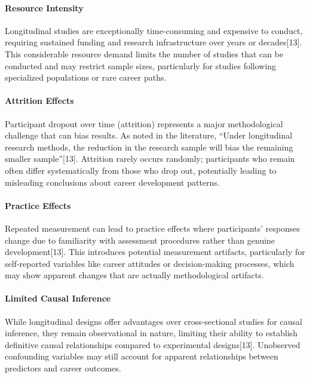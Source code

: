 \documentclass[./main.tex]{subfiles}
\begin{document}
\paragraph{Resource Intensity}\label{resource-intensity}

Longitudinal studies are exceptionally time-consuming and expensive to
conduct, requiring sustained funding and research infrastructure over
years or decades{[}13{]}. This considerable resource demand limits the
number of studies that can be conducted and may restrict sample sizes,
particularly for studies following specialized populations or rare
career paths.

\paragraph{Attrition Effects}\label{attrition-effects}

Participant dropout over time (attrition) represents a major
methodological challenge that can bias results. As noted in the
literature, ``Under longitudinal research methods, the reduction in the
research sample will bias the remaining smaller sample''{[}13{]}.
Attrition rarely occurs randomly; participants who remain often differ
systematically from those who drop out, potentially leading to
misleading conclusions about career development patterns.

\paragraph{Practice Effects}\label{practice-effects}

Repeated measurement can lead to practice effects where participants'
responses change due to familiarity with assessment procedures rather
than genuine development{[}13{]}. This introduces potential measurement
artifacts, particularly for self-reported variables like career
attitudes or decision-making processes, which may show apparent changes
that are actually methodological artifacts.

\paragraph{Limited Causal Inference}\label{limited-causal-inference}

While longitudinal designs offer advantages over cross-sectional studies
for causal inference, they remain observational in nature, limiting
their ability to establish definitive causal relationships compared to
experimental designs{[}13{]}. Unobserved confounding variables may still
account for apparent relationships between predictors and career
outcomes.
\end{document}
